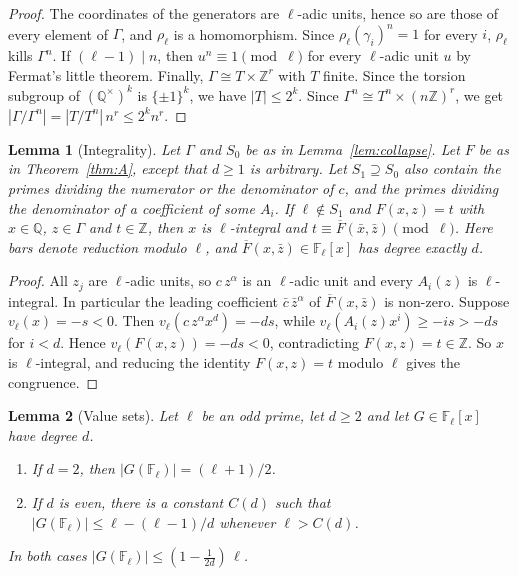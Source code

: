 \documentclass[11pt]{amsart}
\newtheorem{lemma}{Lemma}[section]
\theoremstyle{definition}
\theoremstyle{remark}
\newcommand{\Z}{\mathbb{Z}}
\newcommand{\Q}{\mathbb{Q}}
\newcommand{\F}{\mathbb{F}}
\begin{document}
\begin{proof}
The coordinates of the generators are $\ell$-adic units, hence so are those of every element of $\Gamma$, and $\rho_\ell$ is a homomorphism.
Since $\rho_\ell(\gamma_i)^n=1$ for every $i$, $\rho_\ell$ kills $\Gamma^n$.
If $(\ell-1)\mid n$, then $u^n\equiv1\pmod\ell$ for every $\ell$-adic unit $u$ by Fermat's little theorem.
Finally, $\Gamma\cong T\times\Z^r$ with $T$ finite.
Since the torsion subgroup of $(\Q^\times)^k$ is $\{\pm1\}^k$, we have $|T|\le2^k$.
Since $\Gamma^n\cong T^n\times(n\Z)^r$, we get $|\Gamma/\Gamma^n|=|T/T^n|\,n^r\le2^kn^r$.
\end{proof}

\begin{lemma}[Integrality]\label{lem:integral}
Let $\Gamma$ and $S_0$ be as in Lemma~\ref{lem:collapse}.
Let $F$ be as in Theorem~\ref{thm:A}, except that $d\ge1$ is arbitrary.
Let $S_1\supseteq S_0$ also contain the primes dividing the numerator or the denominator of $c$, and the primes dividing the denominator of a coefficient of some $A_i$.
If $\ell\notin S_1$ and $F(x,z)=t$ with $x\in\Q$, $z\in\Gamma$ and $t\in\Z$, then $x$ is $\ell$-integral and $t\equiv\overline F(\bar x,\bar z)\pmod\ell$.
Here bars denote reduction modulo $\ell$, and $\overline F(x,\bar z)\in\F_\ell[x]$ has degree exactly $d$.
\end{lemma}

\begin{proof}
All $z_j$ are $\ell$-adic units, so $c\,z^\alpha$ is an $\ell$-adic unit and every $A_i(z)$ is $\ell$-integral.
In particular the leading coefficient $\bar c\,\bar z^\alpha$ of $\overline F(x,\bar z)$ is non-zero.
Suppose $v_\ell(x)=-s<0$.
Then $v_\ell(c\,z^\alpha x^d)=-ds$, while $v_\ell(A_i(z)x^i)\ge-is>-ds$ for $i<d$.
Hence $v_\ell(F(x,z))=-ds<0$, contradicting $F(x,z)=t\in\Z$.
So $x$ is $\ell$-integral, and reducing the identity $F(x,z)=t$ modulo $\ell$ gives the congruence.
\end{proof}

\begin{lemma}[Value sets]\label{lem:values}
Let $\ell$ be an odd prime, let $d\ge2$ and let $G\in\F_\ell[x]$ have degree $d$.
\begin{enumerate}
\item If $d=2$, then $|G(\F_\ell)|=(\ell+1)/2$.
\item If $d$ is even, there is a constant $C(d)$ such that $|G(\F_\ell)|\le\ell-(\ell-1)/d$ whenever $\ell>C(d)$.
\end{enumerate}
In both cases $|G(\F_\ell)|\le(1-\tfrac1{2d})\,\ell$.
\end{lemma}
\end{document}
